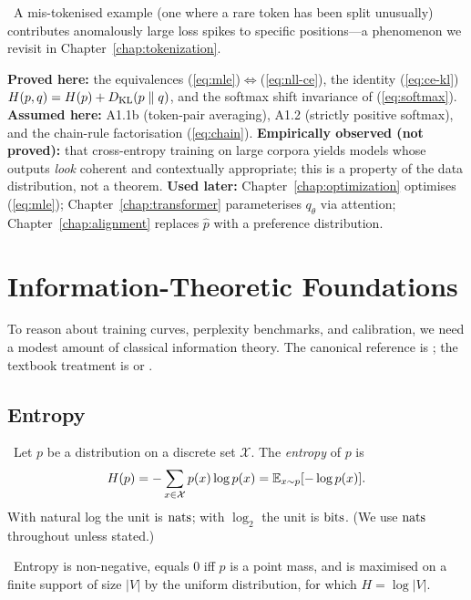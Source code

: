 \Emp\ A mis-tokenised example (one where a rare token has been split
unusually) contributes anomalously large loss spikes to specific
positions---a phenomenon we revisit in Chapter~\ref{chap:tokenization}.

\begin{provedassumed}
\textbf{Proved here:} the equivalences
(\ref{eq:mle})$\Leftrightarrow$(\ref{eq:nll-ce}), the identity
(\ref{eq:ce-kl}) $H(p,q) = H(p) + D_{\mathrm{KL}}(p\parallel q)$, and the softmax
shift invariance of (\ref{eq:softmax}).
\textbf{Assumed here:} A1.1b (token-pair averaging), A1.2 (strictly positive
softmax), and the chain-rule factorisation (\ref{eq:chain}).
\textbf{Empirically observed (not proved):} that cross-entropy
training on large corpora yields models whose outputs \emph{look}
coherent and contextually appropriate; this is a property of the
data distribution, not a theorem.
\textbf{Used later:} Chapter~\ref{chap:optimization} optimises (\ref{eq:mle}); Chapter~\ref{chap:transformer}
parameterises $q_\theta$ via attention; Chapter~\ref{chap:alignment} replaces $\hat p$ with
a preference distribution.
\end{provedassumed}

\section{Information-Theoretic Foundations}

To reason about training curves, perplexity benchmarks, and calibration, we need a modest amount of classical information theory. The canonical reference is \citet{cover2006elements}; the textbook treatment is \citet{bishop2006prml} or \citet{murphy2022pml}.

\subsection{Entropy}

\Def\ Let $p$ be a distribution on a discrete set $\mathcal{X}$. The
\emph{entropy} of $p$ is
\begin{equation}
H(p) = -\sum_{x \in \mathcal{X}} p(x) \log p(x)
     = \mathbb{E}_{x \sim p}[-\log p(x)].
\end{equation}
With natural log the unit is $\mathrm{nats}$; with $\log_2$ the unit is $\mathrm{bits}$.
(We use $\mathrm{nats}$ throughout unless stated.)

\Ident\ Entropy is non-negative, equals $0$ iff $p$ is a point mass,
and is maximised on a finite support of size $|V|$ by the uniform
distribution, for which $H = \log |V|$.

